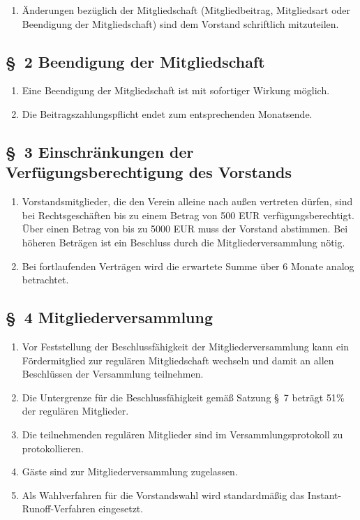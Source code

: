 \documentclass[10pt,a4paper]{article}
\newcommand{\qs}[1]{\glqq#1\grqq}
\begin{document}
\begin{enumerate}
    
\item {\"A}nderungen bez{\"u}glich der Mitgliedschaft (Mitgliedbeitrag, Mitgliedsart oder Beendigung der Mitgliedschaft)
	sind dem Vorstand schriftlich mitzuteilen.
\end{enumerate}
%
%
\subsection*{\S \ 2 Beendigung der Mitgliedschaft}
\begin{enumerate}
\item Eine Beendigung der Mitgliedschaft ist mit sofortiger Wirkung m{\"o}glich.
\item Die Beitragszahlungspflicht endet zum entsprechenden Monatsende.
\end{enumerate}
%
%
\subsection*{\S \ 3 Einschr{\"a}nkungen der Verf{\"u}gungsberechtigung des Vorstands}
\begin{enumerate}
\item Vorstandsmitglieder, die den Verein alleine nach au{\ss}en vertreten
    d{\"u}rfen, sind bei Rechtsgesch{\"a}ften bis zu einem Betrag von 500 EUR
    verf{\"u}gungsberechtigt. {\"U}ber einen Betrag von bis zu 5000 EUR muss der
    Vorstand abstimmen. Bei h{\"o}heren Betr{\"a}gen ist ein Beschluss durch die
    Mitgliederversammlung n{\"o}tig.
\item Bei fortlaufenden Vertr{\"a}gen wird die erwartete Summe
    {\"u}ber 6 Monate analog betrachtet.
\end{enumerate}
%
%
\subsection*{\S \ 4 Mitgliederversammlung}
\begin{enumerate}
\item Vor Feststellung der Beschlussf{\"a}higkeit der Mitgliederversammlung kann ein F{\"o}rdermitglied zur regul{\"a}ren Mitgliedschaft wechseln und damit an allen Beschl{\"u}ssen der Versammlung teilnehmen.
\item Die Untergrenze f{\"u}r die Beschlussf{\"a}higkeit gem{\"a}{\ss} Satzung \S \ 7 betr{\"a}gt 51\% der regul{\"a}ren Mitglieder.
\item Die teilnehmenden regul{\"a}ren Mitglieder sind im Versammlungsprotokoll zu protokollieren.
\item G{\"a}ste sind zur Mitgliederversammlung zugelassen.
\item Als Wahlverfahren f{\"u}r die Vorstandswahl wird standardm{\"a}{\ss}ig das \qs{Instant-Runoff-Verfahren} eingesetzt.
\end{enumerate}
%
%
\end{document}
